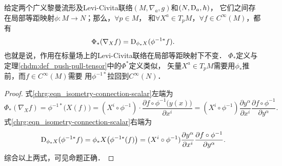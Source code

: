 \begin{proposition}\label{chrg:thm_isometry-connection-scalar}
    给定两个广义黎曼流形及Levi-Civita联络$(M,\nabla_a,g)$和$(N,{\rm D}_a,h)$，
    它们之间存在局部等距映射$\phi:M\to N$；那么，$\forall p\in M$，
    和$\forall X^a \in T_{p}M$，$ \forall f \in C^\infty(M)$，都有
    \begin{equation}\label{chrg:eqn_isometry-connection-scalar}
      \Phi_{*} (\nabla _X f) = {\rm D}_ {\phi_* X} ({\phi^{-1*}}f) .
    \end{equation}
    也就是说，作用在标量场上的Levi-Civita联络在局部等距映射下不变．
    $\Phi_{*}$定义与定理\ref{chdm:def_push-pull-tensor}中的$\Phi^{*}$定义类似，
    矢量$X^a \in T_{p}M$需要用$\phi_{*}$推前，而$f \in C^\infty(M)$需要
    用$\phi^{-1*}$拉回到$ C^\infty(N)$．
\end{proposition}
\begin{proof}
    式\eqref{chrg:eqn_isometry-connection-scalar}左端为
    \begin{equation*}
      \Phi_{*} (\nabla _X f) = \phi^{-1*} \bigl(X (f)\bigr)
      =( X^i \circ \phi^{-1}) \cdot \frac{\partial f\circ \phi^{-1}\bigl(y(x)\bigr)}{\partial x^i}
      = (X^i \circ \phi^{-1})  \frac{\partial y^\alpha}{\partial x^i}
      \frac{\partial f\circ \phi^{-1}}{\partial y^\alpha}.
    \end{equation*}
    式\eqref{chrg:eqn_isometry-connection-scalar}右端为
    \begin{equation*}
      {\rm D}_ {\phi_* X} ({\phi^{-1*}}f) = {\phi_* X} \bigl(\phi^{-1*} (f)\bigr)
      = (X^i \circ \phi^{-1})  \frac{\partial y^\alpha}{\partial x^i}
       \frac{\partial f\circ \phi^{-1}}{\partial y^\alpha}.
    \end{equation*}
    综合以上两式，可见命题正确．
\end{proof}

